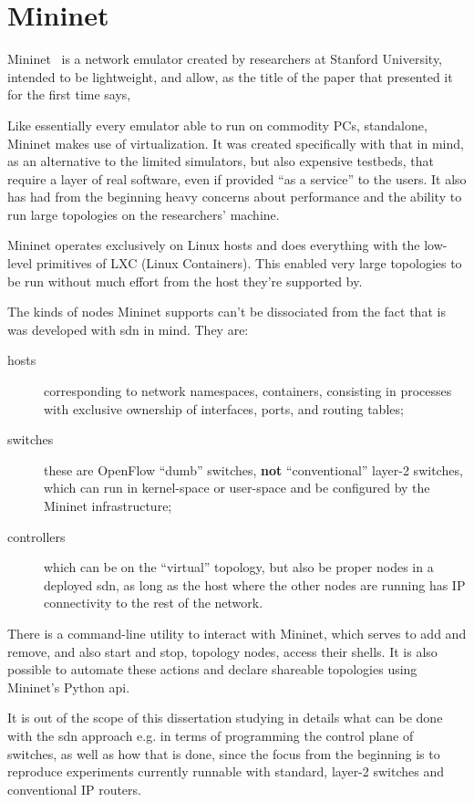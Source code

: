 \section{Mininet}
\label{sec:exemulmininet}

Mininet~\cite{mininetnetworklaptop} is a network emulator created by researchers at Stanford University, intended to be lightweight, and allow, as the title of the paper that presented it for the first time says, 

Like essentially every emulator able to run on commodity PCs, standalone, Mininet makes use of virtualization.
It was created specifically with that in mind, as an alternative to the limited simulators, but also expensive testbeds, that require a layer of real software, even if provided ``as a service'' to the users.
It also has had from the beginning heavy concerns about performance and the ability to run large topologies on the researchers' machine.

Mininet operates exclusively on Linux hosts and does everything with the low-level primitives of LXC (Linux Containers).
This enabled very large topologies to be run without much effort from the host they're supported by.

The kinds of nodes Mininet supports can't be dissociated from the fact that is was developed with \gls{sdn} in mind.
They are:
\begin{description}
	\item[hosts] corresponding to network namespaces, containers, consisting in processes with exclusive ownership of interfaces, ports, and routing tables;
	\item[switches] these are OpenFlow ``dumb'' switches, \textbf{not} ``conventional'' layer-2 switches, which can run in kernel-space or user-space and be configured by the Mininet infrastructure;
	\item[controllers] which can be on the ``virtual'' topology, but also be proper nodes in a deployed \gls{sdn}, as long as the host where the other nodes are running has IP connectivity to the rest of the network.
\end{description}

There is a command-line utility to interact with Mininet, which serves to add and remove, and also start and stop, topology nodes, access their shells.
It is also possible to automate these actions and declare shareable topologies using Mininet's Python \gls{api}.

It is out of the scope of this dissertation studying in details what can be done with the \gls{sdn} approach e.g. in terms of programming the control plane of switches, as well as how that is done, since the focus from the beginning is to reproduce experiments currently runnable with standard, layer-2 switches and conventional IP routers.

